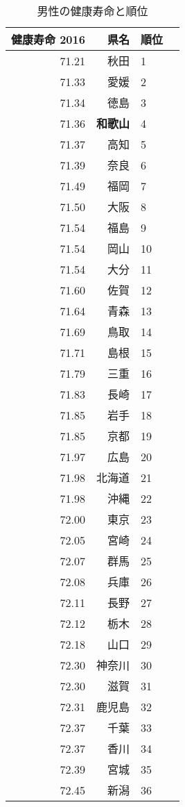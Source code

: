 \begin{table}[ht]
\centering
\scriptsize
\caption{男性の健康寿命と順位}
\begin{tabular}{rrlr}
  \hline
  健康寿命 2016 & 県名 & 順位 \\
  \hline
71.21 & 秋田 &   1 \\
 71.33 & 愛媛 &   2 \\
 71.34 & 徳島 &   3 \\
 71.36 & \textbf{和歌山} &   4 \\
 71.37 & 高知 &   5 \\
 71.39 & 奈良 &   6 \\
 71.49 & 福岡 &   7 \\
 71.50 & 大阪 &   8 \\
 71.54 & 福島 &   9 \\
 71.54 & 岡山 &  10 \\
 71.54 & 大分 &  11 \\
 71.60 & 佐賀 &  12 \\
 71.64 & 青森 &  13 \\
 71.69 & 鳥取 &  14 \\
 71.71 & 島根 &  15 \\
 71.79 & 三重 &  16 \\
 71.83 & 長崎 &  17 \\
 71.85 & 岩手 &  18 \\
 71.85 & 京都 &  19 \\
 71.97 & 広島 &  20 \\
 71.98 & 北海道 &  21 \\
 71.98 & 沖縄 &  22 \\
 72.00 & 東京 &  23 \\
 72.05 & 宮崎 &  24 \\
 72.07 & 群馬 &  25 \\
 72.08 & 兵庫 &  26 \\
 72.11 & 長野 &  27 \\
 72.12 & 栃木 &  28 \\
 72.18 & 山口 &  29 \\
 72.30 & 神奈川 &  30 \\
 72.30 & 滋賀 &  31 \\
 72.31 & 鹿児島 &  32 \\
 72.37 & 千葉 &  33 \\
 72.37 & 香川 &  34 \\
 72.39 & 宮城 &  35 \\
 72.45 & 新潟 &  36 \\

\end{tabular}
\end{table}
